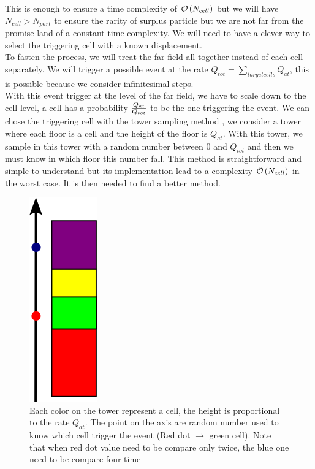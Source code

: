 \documentclass[jcp,twocolumn,longbibliography,superscriptaddress]{revtex4-2}
\newcommand{\Npart}{N_{part}}
\begin{document}
	This is enough to ensure a time complexity of $\mathcal{O}\left( N_{cell} \right)$ but we will have $N_{cell} > \Npart$ to ensure the rarity of surplus particle but we are not far from the promise land of a constant time complexity. We will need to have a clever way to select the triggering cell with a known displacement.\\
	
	To fasten the process, we will treat the far field all together instead of each cell separately. We will trigger a possible event at the rate $Q_{tot} = \sum\limits_{target cells} Q_{at}$, this is possible because we consider infinitesimal steps.\\
	
	With this event trigger at the level of the far field, we have to scale down to the cell level, a cell has a probability $\frac{Q_{at}}{Q_{tot}}$ to be the one triggering the event. We can chose the triggering cell with the tower sampling method , we consider a tower where each floor is a cell and the height of the floor is $Q_{at}$. With this tower, we sample in this tower with a random number between 0 and $Q_{tot}$ and then we must know in which floor this number fall. This method is straightforward and simple to understand but its implementation lead to a complexity $\mathcal{O}\left( N_{cell} \right)$ in the worst case. It is then needed to find a better method.\\
	
	\begin{figure}[htb]
		\centering
		\includegraphics[width=0.18\columnwidth]{./Figures/towerMethod.png}
		\caption{Each color on the tower represent a cell, the height is proportional to the rate $Q_{at}$. The point on the axis are random number used to know which cell trigger the event (Red dot $\rightarrow$ green cell). Note that when red dot value need to be compare only twice, the blue one need to be compare four time}
		\label{tower sampling}
	\end{figure}
	
\end{document}
